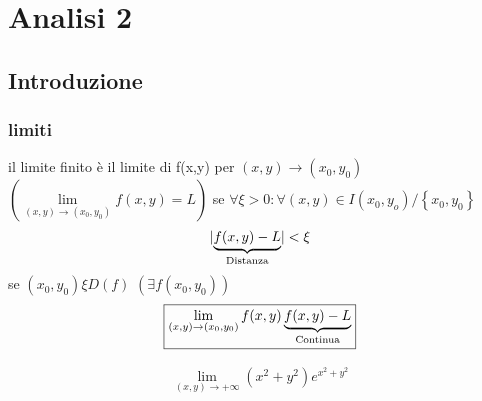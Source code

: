 \part{Analisi 2}
\chapter{Introduzione}

\section{limiti}
\begin{defi}
  il limite finito è il limite di f(x,y) per $(x,y)\to (x_0,y_0)$ $(\lim\limits_{(x,y)\to(x_0,y_0)} f(x,y)=L)$ se $\forall\xi >0: \forall (x,y)\in I(x_0,y_o)/\left\{x_0,y_0\right\}$
\begin{equation*}
  \abs{\underbrace{f(x,y)-L}_{\text{\shortstack{Distanza}}}}<\xi
\end{equation*}
se $(x_0,y_0)\xi D(f)$ $(\exists f(x_0,y_0))$
\begin{equation*}
  \boxed{\lim_{(x,y)\to (x_0,y_0)} f(x,y)\underbrace{f(x,y)-L}_{\text{\shortstack{Continua}}}}
\end{equation*}

\end{defi}
\begin{esempio}
  \begin{equation*}
    \begin{matrix}
      \lim_{(x,y)\to +\infty}(x^2+y^2)e^{x^2+y^2}
      \end{matrix}
  \end{equation*}
\end{esempio}
